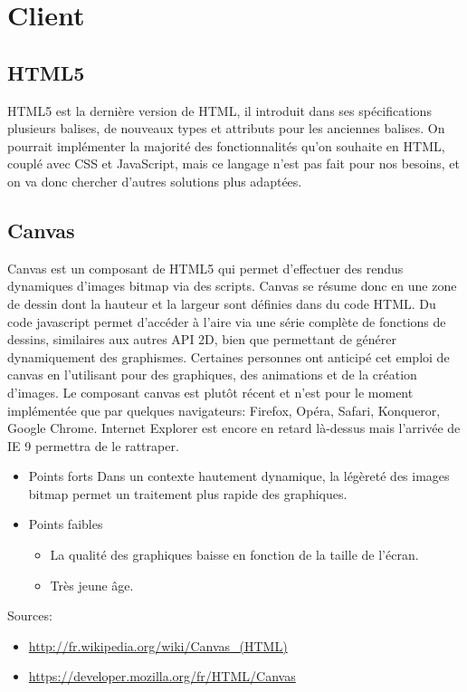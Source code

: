 \documentclass[a4paper,10pt]{report}
\begin{document}
\chapter{Client}




\section{HTML5}
HTML5 est la dernière version de HTML, il introduit dans ses spécifications plusieurs 
balises, 
de nouveaux types et attributs pour les anciennes balises. 
On pourrait implémenter la majorité des fonctionnalités qu'on souhaite en HTML, couplé 
avec CSS et JavaScript, mais ce langage n'est pas fait pour nos besoins, et on va donc 
chercher d'autres solutions plus adaptées. 

\section{Canvas}
Canvas est un composant de HTML5 qui permet d'effectuer des rendus dynamiques d'images 
bitmap via des scripts.
Canvas se résume donc en une zone de dessin dont la hauteur et la largeur sont définies 
dans du code HTML. Du code javascript permet d'accéder à l'aire via une série complète de fonctions de dessins, 
similaires aux autres API 2D, bien que permettant de générer dynamiquement des graphismes. Certaines personnes ont anticipé cet emploi de canvas en l'utilisant pour des graphiques, des animations et de la création d'images.
Le composant canvas est plutôt récent et n'est pour le moment implémentée que par 
quelques navigateurs: Firefox, Opéra, Safari, Konqueror, Google Chrome. 
Internet Explorer est encore en retard là-dessus mais l'arrivée de IE 9 permettra
 de le rattraper.

\begin{itemize}
  \item{Points forts}
Dans un contexte hautement dynamique, la légèreté des images bitmap permet un traitement
 plus rapide des graphiques.
\item{Points faibles}
 \begin{itemize}
\item La qualité des graphiques baisse en fonction de la taille de l'écran.
\item Très jeune âge.
\end{itemize}
\end{itemize}


 Sources:
\begin{itemize}
\item \url{http://fr.wikipedia.org/wiki/Canvas_(HTML)}
\item \url{https://developer.mozilla.org/fr/HTML/Canvas}
\end{itemize} 
	  
\end{document}
